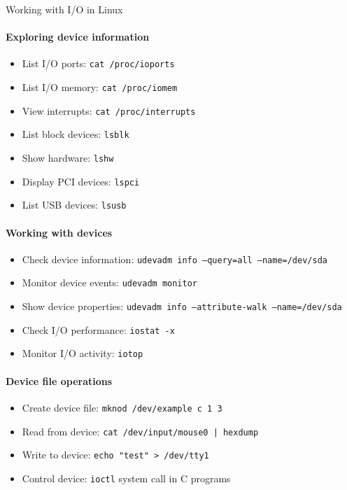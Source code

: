 \begin{KR}{Working with I/O in Linux}
    \paragraph{Exploring device information}
    \begin{itemize}
        \item List I/O ports: \texttt{cat /proc/ioports}
        \item List I/O memory: \texttt{cat /proc/iomem}
        \item View interrupts: \texttt{cat /proc/interrupts}
        \item List block devices: \texttt{lsblk}
        \item Show hardware: \texttt{lshw}
        \item Display PCI devices: \texttt{lspci}
        \item List USB devices: \texttt{lsusb}
    \end{itemize}
    
    \paragraph{Working with devices}
    \begin{itemize}
        \item Check device information: \texttt{udevadm info --query=all --name=/dev/sda}
        \item Monitor device events: \texttt{udevadm monitor}
        \item Show device properties: \texttt{udevadm info --attribute-walk --name=/dev/sda}
        \item Check I/O performance: \texttt{iostat -x}
        \item Monitor I/O activity: \texttt{iotop}
    \end{itemize}
    
    \paragraph{Device file operations}
    \begin{itemize}
        \item Create device file: \texttt{mknod /dev/example c 1 3}
        \item Read from device: \texttt{cat /dev/input/mouse0 | hexdump}
        \item Write to device: \texttt{echo "test" > /dev/tty1}
        \item Control device: \texttt{ioctl} system call in C programs
    \end{itemize}
\end{KR}

